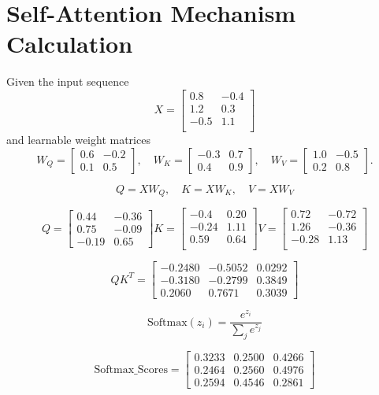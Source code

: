 \documentclass[12pt]{article}
\begin{document}
\section*{Self-Attention Mechanism Calculation}

Given the input sequence
\[
X = \begin{bmatrix}
0.8 & -0.4 \\
1.2 & 0.3 \\
-0.5 & 1.1 \\
\end{bmatrix}
\]
and learnable weight matrices
\[
W_Q = \begin{bmatrix}
0.6 & -0.2 \\
0.1 & 0.5
\end{bmatrix}, \quad
W_K = \begin{bmatrix}
-0.3 & 0.7 \\
0.4 & 0.9
\end{bmatrix}, \quad
W_V = \begin{bmatrix}
1.0 & -0.5 \\
0.2 & 0.8
\end{bmatrix}.
\]


\[
Q = X W_Q,\quad K = X W_K, \quad V = X W_V
\]

\[
Q = \begin{bmatrix}
0.44 & -0.36 \\
0.75 & -0.09 \\
        -0.19 & 0.65
\end{bmatrix}
K = \begin{bmatrix}
-0.4 & 0.20 \\
-0.24 & 1.11 \\
0.59 & 0.64 \\
\end{bmatrix}
V = \begin{bmatrix}
0.72 & -0.72 \\
1.26 & -0.36 \\
-0.28 & 1.13 \\
\end{bmatrix}
\]

\[
QK^T =
\begin{bmatrix}
-0.2480 & -0.5052 & 0.0292 \\
-0.3180 & -0.2799 & 0.3849 \\
0.2060 & 0.7671 & 0.3039
\end{bmatrix}
\]

\[
\text{Softmax}(z_i) = \frac{e^{z_i}}{\sum_{j} e^{z_j}}
\]

\[
\text{Softmax\_Scores} =
\begin{bmatrix}
0.3233 & 0.2500 & 0.4266 \\
0.2464 & 0.2560 & 0.4976 \\
0.2594 & 0.4546 & 0.2861
\end{bmatrix}
\]
\]
\end{document}
